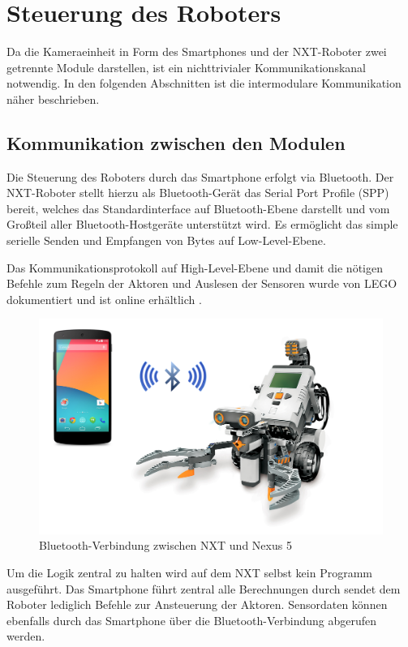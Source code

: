 \section{Steuerung des Roboters}
\label{sec:RoboterSteuerung}

Da die Kameraeinheit in Form des Smartphones und der NXT-Roboter zwei getrennte Module darstellen, ist ein nichttrivialer Kommunikationskanal notwendig. In den folgenden Abschnitten ist die intermodulare Kommunikation näher beschrieben.

\subsection{Kommunikation zwischen den Modulen}

Die Steuerung des Roboters durch das Smartphone erfolgt via Bluetooth. Der NXT-Roboter stellt hierzu als Bluetooth-Gerät das Serial Port Profile (SPP) bereit, welches das Standardinterface auf Bluetooth-Ebene darstellt und vom Großteil aller Bluetooth-Hostgeräte unterstützt wird. Es ermöglicht das simple serielle Senden und Empfangen von Bytes auf Low-Level-Ebene.

Das Kommunikationsprotokoll auf High-Level-Ebene und damit die nötigen Befehle zum Regeln der Aktoren und Auslesen der Sensoren wurde von LEGO dokumentiert und ist online erhältlich \cite{nxt_comm_protocol}.

\begin{figure}[h]
\centering
\includegraphics[width=\textwidth/2]{Bilder/Robot/bluetooth}
\caption{Bluetooth-Verbindung zwischen NXT und Nexus 5}
\label{fig:bluetooth}
\end{figure}

Um die Logik zentral zu halten wird auf dem NXT selbst kein Programm ausgeführt. Das Smartphone führt zentral alle Berechnungen durch sendet dem Roboter lediglich Befehle zur Ansteuerung der Aktoren. Sensordaten können ebenfalls durch das Smartphone über die Bluetooth-Verbindung abgerufen werden.

